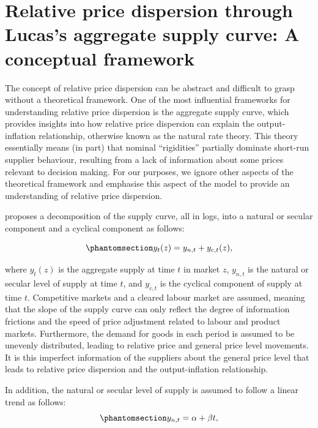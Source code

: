 \documentclass[
  letterpaper,
  DIV=11,
  numbers=noendperiod]{scrartcl}
\begin{document}
\section{Relative price dispersion through Lucas's aggregate supply
curve: A conceptual
framework}\label{relative-price-dispersion-through-lucass-aggregate-supply-curve-a-conceptual-framework}

The concept of relative price dispersion can be abstract and difficult
to grasp without a theoretical framework. One of the most influential
frameworks for understanding relative price dispersion is the
\citet{lucas1973} aggregate supply curve, which provides insights into
how relative price dispersion can explain the output-inflation
relationship, otherwise known as the natural rate theory. This theory
essentially means (in part) that nominal ``rigidities'' partially
dominate short-run supplier behaviour, resulting from a lack of
information about some prices relevant to decision making. For our
purposes, we ignore other aspects of the theoretical framework and
emphasise this aspect of the model to provide an understanding of
relative price dispersion.

\citet{lucas1973} proposes a decomposition of the supply curve, all in
logs, into a natural or secular component and a cyclical component as
follows:

\begin{equation}\phantomsection\label{eq-lucas_supply_curve}{y_t(z) = y_{n,t} + y_{c,t}(z), }\end{equation}

where \(y_t(z)\) is the aggregate supply at time \(t\) in market \(z\),
\(y_{n,t}\) is the natural or secular level of supply at time \(t\), and
\(y_{c,t}\) is the cyclical component of supply at time \(t\).
Competitive markets and a cleared labour market are assumed, meaning
that the slope of the supply curve can only reflect the degree of
information frictions and the speed of price adjustment related to
labour and product markets. Furthermore, the demand for goods in each
period is assumed to be unevenly distributed, leading to relative price
and general price level movements. It is this imperfect information of
the suppliers about the general price level that leads to relative price
dispersion and the output-inflation relationship.

In addition, the natural or secular level of supply is assumed to follow
a linear trend as follows:
\begin{equation}\phantomsection\label{eq-natural_supply}{ y_{n,t} = \alpha + \beta t, }\end{equation}
\end{document}
